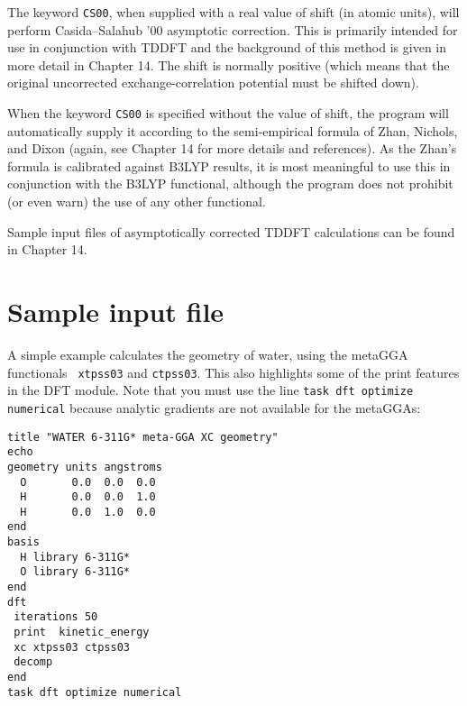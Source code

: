 The keyword \verb+CS00+, when supplied with a real value of shift (in atomic units),
will perform Casida--Salahub '00 asymptotic correction.  This is primarily intended
for use in conjunction with TDDFT and the background of this method is given in more
detail in Chapter 14.  The shift is normally positive (which means that the original
uncorrected exchange-correlation potential must be shifted down).

When the keyword \verb+CS00+ is specified without the value of shift, the program will
automatically supply it according to the semi-empirical formula of Zhan, Nichols, and
Dixon (again, see Chapter 14 for more details and references).  As the Zhan's formula 
is calibrated against B3LYP results, it is most meaningful to use this in conjunction
with the B3LYP functional, although the program does not prohibit (or even warn) the use
of any other functional.

Sample input files of asymptotically corrected TDDFT calculations can be found in 
Chapter 14.

\section{Sample input file}
\label{sec:DFTsample}
A simple example  calculates the geometry
 of water, using the metaGGA functionals
\verb+ xtpss03+ and \verb+ctpss03+.
This also highlights some of
the print features in the DFT module.  Note
that you must use the line
\verb+task dft optimize numerical+ because
analytic gradients are not available for the metaGGAs:
\begin{verbatim}
title "WATER 6-311G* meta-GGA XC geometry"
echo
geometry units angstroms
  O       0.0  0.0  0.0
  H       0.0  0.0  1.0
  H       0.0  1.0  0.0
end
basis
  H library 6-311G*
  O library 6-311G*
end
dft
 iterations 50
 print  kinetic_energy
 xc xtpss03 ctpss03
 decomp
end
task dft optimize numerical
\end{verbatim}





